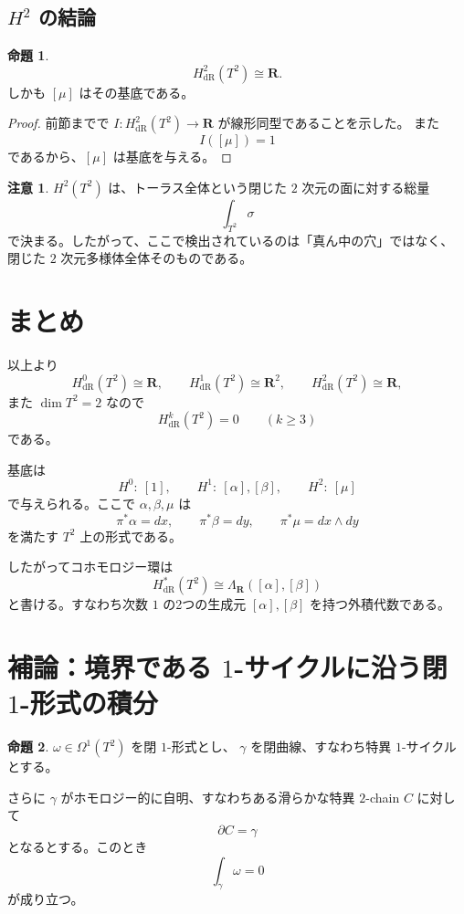 \documentclass[uplatex,dvipdfmx,11pt]{jsarticle}
\newcommand{\R}{\mathbf{R}}
\theoremstyle{definition}
\newtheorem{prop}{命題}
\newtheorem{remark}{注意}
\begin{document}
\subsection{\(H^2\) の結論}

\begin{prop}
\[
H^2_{\mathrm{dR}}(T^2)\cong \R.
\]
しかも \([\mu]\) はその基底である。
\end{prop}

\begin{proof}
前節までで \(I:H^2_{\mathrm{dR}}(T^2)\to\R\) が線形同型であることを示した。
また
\[
I([\mu])=1
\]
であるから、\([\mu]\) は基底を与える。
\end{proof}

\begin{remark}
\(H^2(T^2)\) は、トーラス全体という閉じた $2$ 次元の面に対する総量
\[
\int_{T^2}\sigma
\]
で決まる。したがって、ここで検出されているのは「真ん中の穴」ではなく、
閉じた $2$ 次元多様体全体そのものである。
\end{remark}

\section{まとめ}

以上より
\[
H^0_{\mathrm{dR}}(T^2)\cong \R,\qquad
H^1_{\mathrm{dR}}(T^2)\cong \R^2,\qquad
H^2_{\mathrm{dR}}(T^2)\cong \R,
\]
また \(\dim T^2=2\) なので
\[
H^k_{\mathrm{dR}}(T^2)=0\qquad (k\ge 3)
\]
である。

基底は
\[
H^0:\ [1],\qquad
H^1:\ [\alpha],[\beta],\qquad
H^2:\ [\mu]
\]
で与えられる。ここで \(\alpha,\beta,\mu\) は
\[
\pi^*\alpha=dx,\qquad \pi^*\beta=dy,\qquad \pi^*\mu=dx\wedge dy
\]
を満たす \(T^2\) 上の形式である。

したがってコホモロジー環は
\[
H^*_{\mathrm{dR}}(T^2)\cong \Lambda_{\R}([\alpha],[\beta])
\]
と書ける。すなわち次数 $1$ の2つの生成元 \([\alpha],[\beta]\) を持つ外積代数である。

\section*{補論：境界である \(1\)-サイクルに沿う閉 \(1\)-形式の積分}

\begin{prop}
\(\omega\in\Omega^1(T^2)\) を閉 \(1\)-形式とし、
\(\gamma\) を閉曲線、すなわち特異 \(1\)-サイクルとする。

さらに \(\gamma\) がホモロジー的に自明、すなわちある滑らかな特異 \(2\)-chain \(C\) に対して
\[
\partial C=\gamma
\]
となるとする。このとき
\[
\int_\gamma \omega=0
\]
が成り立つ。
\end{prop}
\end{document}
